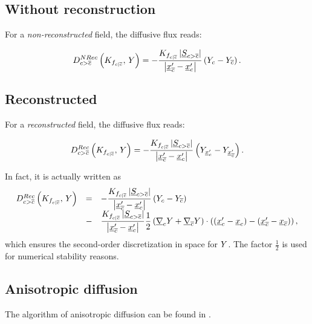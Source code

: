 \subsection{Without reconstruction}
For a \emph{non-reconstructed} field, the diffusive flux reads:

\begin{equation}
D_{{c > {\overline{c}}}}^{NRec} \left( K_{{{f}_{c|{\overline{c}}}}} , \, Y \right)  =  - \dfrac{K_{{{f}_{c|{\overline{c}}}}} \left| \underline{S}_{{c > {\overline{c}}}} \right|}{\left| \underline{x}_{{\overline{c}}}^\prime - \underline{x}_{c}^\prime \right| } \left( Y_{c} - Y_{{\overline{c}}}\right).
\end{equation}


\subsection{Reconstructed}
For a \emph{reconstructed} field, the diffusive flux reads:

\begin{equation}
D_{{c > {\overline{c}}}}^{Rec} \left( K_{{{f}_{c|{\overline{c}}}}} , \, Y \right)  =  - \dfrac{K_{{{f}_{c|{\overline{c}}}}} \left| \underline{S}_{{c > {\overline{c}}}} \right|}{\left| \underline{x}_{{\overline{c}}}^\prime - \underline{x}_{c}^\prime \right| } \left( Y_{\underline{x}_{c}^\prime} - Y_{\underline{x}_{{\overline{c}}}^\prime} \right).
\end{equation}

\begin{remark}
In fact, it is actually written as
%
\begin{equation}
\begin{array}{r c l}
D_{{c > {\overline{c}}}}^{Rec} \left( K_{{{f}_{c|{\overline{c}}}}} , \, Y \right)  &=&  - \dfrac{K_{{{f}_{c|{\overline{c}}}}} \left| \underline{S}_{{c > {\overline{c}}}} \right|}{\left| \underline{x}_{{\overline{c}}}^\prime - \underline{x}_{c}^\prime \right| } \left( Y_{c} - Y_{{\overline{c}}} \right) \\
&-& \dfrac{K_{{{f}_{c|{\overline{c}}}}} \left| \underline{S}_{{c > {\overline{c}}}} \right|}{\left| \underline{x}_{{\overline{c}}}^\prime - \underline{x}_{c}^\prime \right| }  \dfrac{1}{2}\left( \underline{\nabla}_{c} Y + \underline{\nabla}_{{\overline{c}}} Y \right) \cdot \left( \left(\underline{x}_{c}^\prime - {\underline{x}_{c}}\right) - \left(\underline{x}_{{\overline{c}}}^\prime - \underline{x}_{{\overline{c}}}\right) \right),
\end{array}
\end{equation}
%
which ensures the second-order discretization in space for $Y$.
The factor $ \frac{1}{2}$ is used for numerical stability reasons.
\end{remark}

\subsection{Anisotropic diffusion}
The algorithm of anisotropic diffusion can be found in \cite{ferrand2014anisotropic}.

